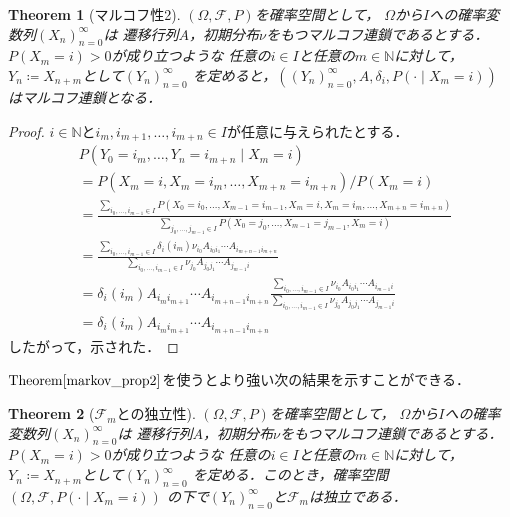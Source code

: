 \documentclass[dvipdfmx,autodetect-engine]{jsarticle}
\newtheorem{theorem}{Theorem}[section]
\theoremstyle{remark}
\theoremstyle{definition}
\newcommand{\N}{\mathbb{N}}
\begin{document}
\begin{theorem}[マルコフ性2]\label{markov_prop2}
    $(\Omega,\mathcal{F},P)$を確率空間として，
    $\Omega$から$I$への確率変数列$(X_n)_{n=0}^{\infty}$は
    遷移行列$A$，初期分布$\nu$をもつマルコフ連鎖であるとする．
    $P(X_m = i) >0$が成り立つような
    任意の$i \in I$と任意の$m \in \N$に対して，
    $Y_n \coloneqq X_{n+m}$として$(Y_n)_{n=0}^{\infty}$
    を定めると，$((Y_n)_{n=0}^{\infty},A,\delta_i, P(\cdot \mid X_m = i))$
    はマルコフ連鎖となる．
\end{theorem}


\begin{proof}
    $i \in \N$と$i_m,i_{m+1},\ldots,i_{m+n} \in I$が任意に与えられたとする．
    \begin{align}
        &P(Y_0 = i_m ,\ldots, Y_n = i_{m+n} \mid X_m = i) \\
        &= P(X_m = i,X_m = i_m,\ldots,X_{m+n}=i_{m+n}) / P(X_m = i) \\
        &= \frac{\sum_{i_0,\ldots,i_{m-1} \in I} P(X_0 = i_0,\ldots, 
        X_{m-1} = i_{m-1},X_m = i,X_m = i_m,\ldots,X_{m+n}=i_{m+n})}{\sum_{j_0,\ldots,j_{m-1} 
        \in I} P(X_0 = j_0,\ldots, X_{m-1} = j_{m-1},X_m = i)}\\
        &= \frac{\sum_{i_0,\ldots,i_{m-1} \in I} \delta_{i}(i_m) 
         \nu_{i_0} A_{i_0 i_1} \cdots A_{i_{m+n-1}{i_{m+n}}}}{\sum_{i_0,\ldots,i_{m-1} \in I} 
         \nu_{j_0} A_{j_0 j_1} \cdots A_{j_{m-1} i}} \\
        &= \delta_{i}(i_m) A_{i_{m} i_{m+1}} \cdots A_{i_{m+n-1} i_{m+n}} \frac{\sum_{i_0,\ldots,i_{m-1} \in I} 
        \nu_{i_0} A_{i_0 i_1} \cdots A_{i_{m-1} i}}{\sum_{i_0,\ldots,i_{m-1} \in I} 
        \nu_{j_0} A_{j_0 j_1} \cdots A_{j_{m-1} i}} \\
        &= \delta_{i}(i_m) A_{i_{m} i_{m+1}} \cdots A_{i_{m+n-1} i_{m+n}}
    \end{align}
    したがって，示された．
\end{proof}


$\mathrm{Theorem}\ref{markov_prop2}$を使うとより強い次の結果を示すことができる．


\begin{theorem}[$\mathcal{F}_{m}$との独立性]
    $(\Omega,\mathcal{F},P)$を確率空間として，
    $\Omega$から$I$への確率変数列$(X_n)_{n=0}^{\infty}$は
    遷移行列$A$，初期分布$\nu$をもつマルコフ連鎖であるとする．
    $P(X_m = i) >0$が成り立つような
    任意の$i \in I$と任意の$m \in \N$に対して，
    $Y_n \coloneqq X_{n+m}$として$(Y_n)_{n=0}^{\infty}$
    を定める．このとき，確率空間$(\Omega,\mathcal{F},P(\cdot \mid X_m = i))$
    の下で$(Y_n)_{n=0}^{\infty}$と$\mathcal{F}_m$は独立である．
\end{theorem}
\end{document}
